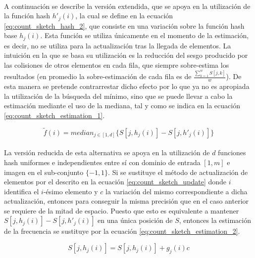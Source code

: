 \documentclass{subfiles}
\begin{document}
      \paragraph{}
      A continuación se describe la versión extendida, que se apoya en la utilización de la función hash $h'_j(i)$, la cual se define en la ecuación \eqref{eq:count_sketch_hash_2}, que consiste en una variación sobre la función hash base $h_j(i)$. Esta función se utiliza únicamente en el momento de la estimación, es decir, no se utiliza para la actualización tras la llegada de elementos. La intuición en la que se basa su utilización es la reducción del sesgo producido por las colisiones de otros elementos en cada fila, que siempre sobre-estima los resultados (en promedio la sobre-estimación de cada fila es de $\frac{\sum_{k=1}^wS[j,k]}{w}$). De esta manera se pretende contrarrestar dicho efecto por lo que ya no es apropiada la utilización de la búsqueda del mínimo, sino que se puede llevar a cabo la estimación mediante el uso de la mediana, tal y como se indica en la ecuación \eqref{eq:count_sketch_estimation_1}.

      \begin{equation}
      \label{eq:count_sketch_estimation_1}
        \widetilde{f}(i) = median_{j \in [1,d]}\{S[j, h_j(i)] - S[j, h'_j(i)]\}
      \end{equation}

      \paragraph{}
      La versión reducida de esta alternativa se apoya en la utilización de $d$ funciones hash uniformes e independientes entre sí con dominio de entrada $[1,m]$ e imagen en el sub-conjunto $\{-1,1\}$. Si se sustituye el método de actualización de elementos por el descrito en la ecuación \eqref{eq:count_sketch_update} donde $i$ identifica el $i$-ésimo elemento y $c$ la variación del mismo correspondiente a dicha actualización, entonces para conseguir la misma precisión que en el caso anterior se requiere de la mitad de espacio. Puesto que esto es equivalente a mantener $S[j, h_j(i)] - S[j, h'_j(i)]$ en una única posición de $S$, entonces la estimación de la frecuencia se sustituye por la ecuación \eqref{eq:count_sketch_estimation_2}.

      \begin{equation}
      \label{eq:count_sketch_update}
        S[j,h_j(i)] = S[j,h_j(i)] +  g_j(i)c
      \end{equation}
\end{document}
